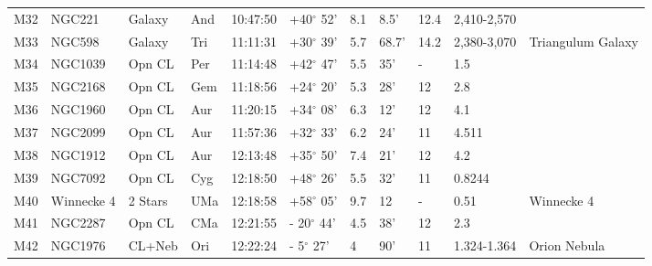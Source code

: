 \begin{longtable}{@{}lllllllllll@{}}
M32        & NGC221      & Galaxy     & And       & 10:47:50 & +40$^{\circ}$ 52'  & 8.1       & 8.5'                 & 12.4     & 2,410-2,570         &                                           \\
M33        & NGC598      & Galaxy     & Tri       & 11:11:31 & +30$^{\circ}$ 39'  & 5.7       & 68.7'                & 14.2     & 2,380-3,070         & Triangulum Galaxy                         \\
M34        & NGC1039     & Opn CL     & Per       & 11:14:48 & +42$^{\circ}$ 47'  & 5.5       & 35'                  & -        & 1.5                 &                                           \\
M35        & NGC2168     & Opn CL     & Gem       & 11:18:56 & +24$^{\circ}$ 20'  & 5.3       & 28'                  & 12       & 2.8                 &                                           \\
M36        & NGC1960     & Opn CL     & Aur       & 11:20:15 & +34$^{\circ}$ 08'  & 6.3       & 12'                  & 12       & 4.1                 &                                           \\
M37        & NGC2099     & Opn CL     & Aur       & 11:57:36 & +32$^{\circ}$ 33'  & 6.2       & 24'                  & 11       & 4.511               &                                           \\
M38        & NGC1912     & Opn CL     & Aur       & 12:13:48 & +35$^{\circ}$ 50'  & 7.4       & 21'                  & 12       & 4.2                 &                                           \\
M39        & NGC7092     & Opn CL     & Cyg       & 12:18:50 & +48$^{\circ}$ 26'  & 5.5       & 32'                  & 11       & 0.8244              &                                           \\
M40        & Winnecke 4  & 2 Stars    & UMa       & 12:18:58 & +58$^{\circ}$ 05'  & 9.7       & 12                   & -        & 0.51                & Winnecke 4                                \\
M41        & NGC2287     & Opn CL     & CMa       & 12:21:55 & - 20$^{\circ}$ 44' & 4.5       & 38'                  & 12       & 2.3                 &                                           \\
M42        & NGC1976     & CL+Neb     & Ori       & 12:22:24 & - 5$^{\circ}$ 27'  & 4         & 90'                  & 11       & 1.324-1.364         & Orion Nebula                              \\

\end{longtable}
